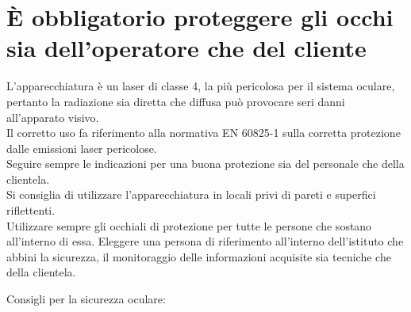 \documentclass[10pt]{article}
\begin{document}
\section{È obbligatorio proteggere gli occhi sia dell'operatore che del cliente}
L'apparecchiatura è un laser di classe 4, la più pericolosa per il sistema oculare, pertanto la radiazione sia diretta che diffusa può provocare seri danni all’apparato visivo.\\
Il corretto uso fa riferimento alla normativa EN 60825-1 sulla corretta protezione dalle emissioni laser pericolose.\\
Seguire sempre le indicazioni per una buona protezione sia del personale che della clientela.\\
Si consiglia di utilizzare l'apparecchiatura in locali privi di pareti e superfici riflettenti.\\
Utilizzare sempre gli occhiali di protezione per tutte le persone che sostano all'interno di essa. Eleggere una persona di riferimento all'interno dell'istituto che abbini la sicurezza, il monitoraggio delle informazioni acquisite sia tecniche che della clientela.

Consigli per la sicurezza oculare:
\end{document}
